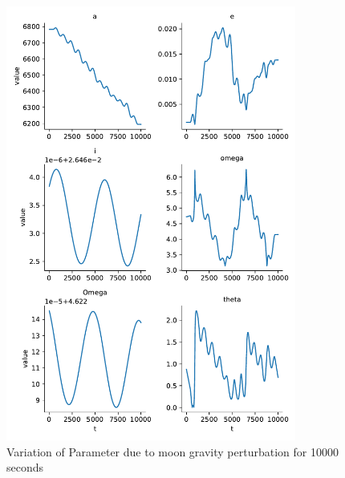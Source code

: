 \begin{figure}[H]
    \centering
    \includegraphics[width=0.85\textwidth]{../Figure/Q2/orbital_elements_variation_moon_10000}
    \caption{Variation of Parameter due to moon gravity perturbation for 10000 seconds}
\end{figure}

